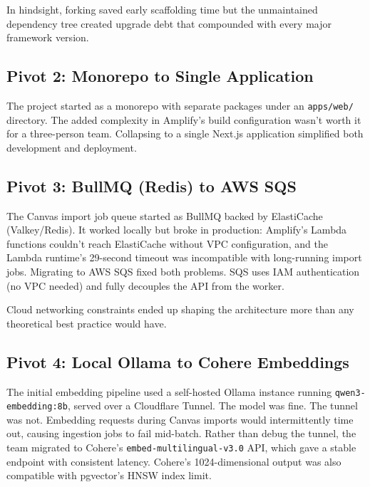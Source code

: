 \documentclass[12pt,a4paper]{article}
\newcommand{\tech}[1]{\texttt{#1}}
\begin{document}
In hindsight, forking saved early scaffolding time but the unmaintained dependency tree created upgrade debt that compounded with every major framework version.

\subsection{Pivot 2: Monorepo to Single Application}
\label{sec:pivot-2}

The project started as a monorepo with separate packages under an \tech{apps/web/} directory. The added complexity in Amplify's build configuration wasn't worth it for a three-person team. Collapsing to a single Next.js application simplified both development and deployment.

\subsection{Pivot 3: BullMQ (Redis) to AWS SQS}
\label{sec:pivot-3}

The Canvas import job queue started as BullMQ backed by ElastiCache (Valkey/Redis). It worked locally but broke in production: Amplify's Lambda functions couldn't reach ElastiCache without VPC configuration, and the Lambda runtime's 29-second timeout was incompatible with long-running import jobs. Migrating to AWS SQS fixed both problems. SQS uses IAM authentication (no VPC needed) and fully decouples the API from the worker.

Cloud networking constraints ended up shaping the architecture more than any theoretical best practice would have.

\subsection{Pivot 4: Local Ollama to Cohere Embeddings}
\label{sec:pivot-4}

\begin{sloppypar}
The initial embedding pipeline used a self-hosted Ollama instance running \tech{qwen3-embedding:8b}, served over a Cloudflare Tunnel. The model was fine. The tunnel was not. Embedding requests during Canvas imports would intermittently time out, causing ingestion jobs to fail mid-batch. Rather than debug the tunnel, the team migrated to Cohere's \tech{embed-multilingual-v3.0} API, which gave a stable endpoint with consistent latency. Cohere's 1024-dimensional output was also compatible with pgvector's HNSW index limit.
\end{sloppypar}
\end{document}
